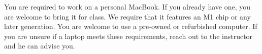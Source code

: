 You are required to work on a personal MacBook. If you already have one, you are welcome to bring it for class. We require that it features an M1 chip or any later generation. You are welcome to use a pre-owned or refurbished computer. If you are unsure if a laptop meets these requirements, reach out to the instructor and he can advise you.
